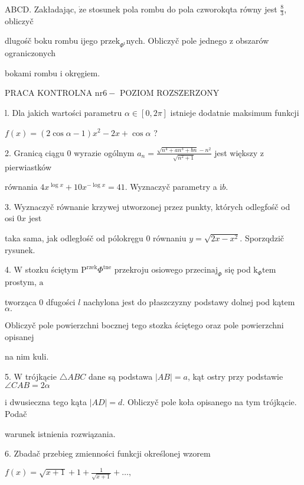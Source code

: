 \documentclass[a4paper,12pt]{article}
\begin{document}
ABCD. Zakładając, $\dot{\mathrm{z}}\mathrm{e}$ stosunek pola rombu do pola czworokqta równy jest $\displaystyle \frac{8}{3}$, obliczyč

dlugośč boku rombu ijego $\mathrm{p}\mathrm{r}\mathrm{z}\mathrm{e}\mathrm{k}_{\Phi^{\mathrm{t}}}$nych. Obliczyč pole jednego $\mathrm{z}$ obszarów ograniczonych

bokami rombu $\mathrm{i}$ okręgiem.





PRACA KONTROLNA $\mathrm{n}\mathrm{r}6-$ POZIOM ROZSZERZONY

l. Dla jakich wartości parametru $\alpha\in[0,2\pi]$ istnieje dodatnie maksimum funkcji

$ f(x)=(2\cos\alpha-1)x^{2}-2x+\cos\alpha$ ?

2. Granicą ciągu $0$ wyrazie ogólnym $a_{n}=\displaystyle \frac{\sqrt{n^{4}+an^{3}+bn}-n^{2}}{\sqrt{n^{2}+1}}$ jest większy $\mathrm{z}$ pierwiastków

równania $4x^{\log x}+10x^{-\log x}=41$. Wyznaczyč parametry a $\mathrm{i}b.$

3. Wyznaczyč równanie krzywej utworzonej przez punkty, których odlegfośč od osi $0x$ jest

taka sama, jak odległośč od pólokręgu $0$ równaniu $y=\sqrt{2x-x^{2}}$. Sporzqdzič rysunek.

4. $\mathrm{W}$ stozku ściętym $\mathrm{P}^{\mathrm{r}\mathrm{z}\mathrm{e}\mathrm{k}}\Phi^{\mathrm{t}\mathrm{n}\mathrm{e}}$ przekroju osiowego $\mathrm{p}\mathrm{r}\mathrm{z}\mathrm{e}\mathrm{c}\mathrm{i}\mathrm{n}\mathrm{a}\mathrm{j}_{\Phi}$ się pod $\mathrm{k}_{\Phi}\mathrm{t}\mathrm{e}\mathrm{m}$ prostym, $\mathrm{a}$

tworząca $0$ dfugości $l$ nachylona jest do płaszczyzny podstawy dolnej pod kątem $\alpha.$

Obliczyč pole powierzchni bocznej tego stozka ściętego oraz pole powierzchni opisanej

na nim kuli.

5. $\mathrm{W}$ trójkącie $\triangle ABC$ dane są podstawa $|AB|=a$, kąt ostry przy podstawie $\angle CAB=2\alpha$

$\mathrm{i}$ dwusieczna tego kąta $|AD|=d$. Obliczyč pole koła opisanego na tym trójkącie. Podač

warunek istnienia rozwiązania.

6. Zbadač przebieg zmienności funkcji określonej wzorem

$f(x)=\displaystyle \sqrt{x+1}+1+\frac{1}{\sqrt{x+1}}+\ldots,$
\end{document}
